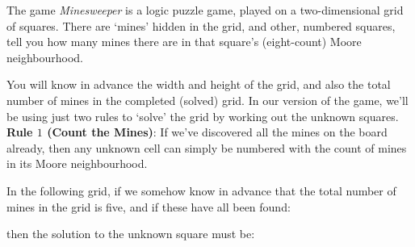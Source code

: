 
The game {\it Minesweeper}
is a logic puzzle game, played on a two-dimensional
grid of squares. There are `mines' hidden in the grid, and other, numbered squares,
tell you how many mines there are in that square's (eight-count) Moore neighbourhood.

You will know in advance the width and height of the grid, and also the
total number of mines in the completed (solved) grid.  In our version of
the game, we'll be using just two rules to `solve' the grid by working
out the unknown squares.
\\[1em]
{\bf Rule $1$ (Count the Mines)}: If we've discovered all the mines on the board already, then any unknown cell
can simply be numbered with the count of mines in its Moore neighbourhood.

In the following grid,
if we somehow know in advance that the total number of mines in the grid is five, and if these have all been found:\\
\begin{center}
\end{center}

\noindent then the solution to the unknown square must be:\\
\begin{center}
\end{center}

